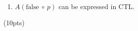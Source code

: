 \documentclass[11pt]{article}
\newcommand{\ax}[1]{\texttt{AX}(#1)}
\newcommand{\ag}[1]{\texttt{AG}(#1)}
\begin{document}
\begin{enumerate}
\begin{enumerate}
\item $A(\mbox{false}\ \circ\ p)$ can be expressed in CTL.

\end{enumerate}
\hfill(10pts)












\end{enumerate}
\end{document}
